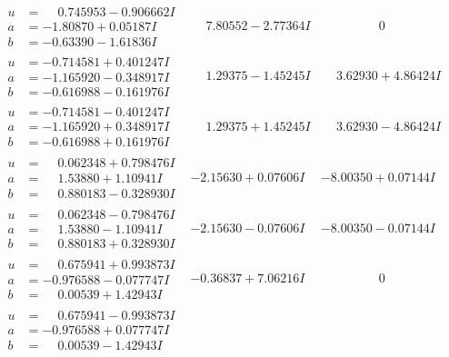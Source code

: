 \documentclass[1p]{elsarticle_modified}
\theoremstyle{definition}
\begin{document}
$$\begin{array}{c|c|c}
\begin{aligned}
u &= \phantom{-}0.745953 - 0.906662 I \\
a &= -1.80870 + 0.05187 I \\
b &= -0.63390 - 1.61836 I\end{aligned}
 & \phantom{-}7.80552 - 2.77364 I & \phantom{-0.000000 } 0 \\ \hline\begin{aligned}
u &= -0.714581 + 0.401247 I \\
a &= -1.165920 - 0.348917 I \\
b &= -0.616988 - 0.161976 I\end{aligned}
 & \phantom{-}1.29375 - 1.45245 I & \phantom{-}3.62930 + 4.86424 I \\ \hline\begin{aligned}
u &= -0.714581 - 0.401247 I \\
a &= -1.165920 + 0.348917 I \\
b &= -0.616988 + 0.161976 I\end{aligned}
 & \phantom{-}1.29375 + 1.45245 I & \phantom{-}3.62930 - 4.86424 I \\ \hline\begin{aligned}
u &= \phantom{-}0.062348 + 0.798476 I \\
a &= \phantom{-}1.53880 + 1.10941 I \\
b &= \phantom{-}0.880183 - 0.328930 I\end{aligned}
 & -2.15630 + 0.07606 I & -8.00350 + 0.07144 I \\ \hline\begin{aligned}
u &= \phantom{-}0.062348 - 0.798476 I \\
a &= \phantom{-}1.53880 - 1.10941 I \\
b &= \phantom{-}0.880183 + 0.328930 I\end{aligned}
 & -2.15630 - 0.07606 I & -8.00350 - 0.07144 I \\ \hline\begin{aligned}
u &= \phantom{-}0.675941 + 0.993873 I \\
a &= -0.976588 - 0.077747 I \\
b &= \phantom{-}0.00539 + 1.42943 I\end{aligned}
 & -0.36837 + 7.06216 I & \phantom{-0.000000 } 0 \\ \hline\begin{aligned}
u &= \phantom{-}0.675941 - 0.993873 I \\
a &= -0.976588 + 0.077747 I \\
b &= \phantom{-}0.00539 - 1.42943 I\end{aligned}

\end{array}$$
\end{document}
